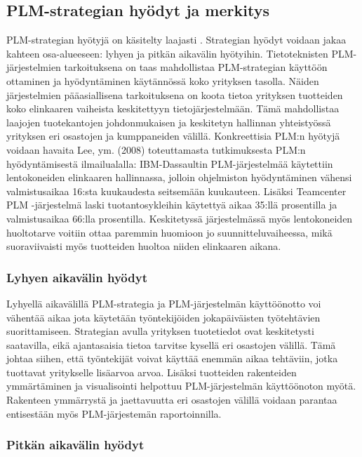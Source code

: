 \subsection{PLM-strategian hyödyt ja merkitys} \label{PLM strategian hyödyt}

PLM-strategian hyötyjä on käsitelty laajasti \cite{alemanni_key_2008} \cite{rivest_product_2012}. Strategian hyödyt voidaan jakaa kahteen osa-alueeseen: lyhyen ja pitkän aikavälin hyötyihin. Tietoteknisten PLM-järjestelmien tarkoituksena on taas mahdollistaa PLM-strategian käyttöön ottaminen ja hyödyntäminen käytännössä koko yrityksen tasolla. Näiden järjestelmien pääasiallisena tarkoituksena on koota tietoa yrityksen tuotteiden koko elinkaaren vaiheista keskitettyyn tietojärjestelmään. Tämä mahdollistaa laajojen tuotekantojen johdonmukaisen ja keskitetyn hallinnan yhteistyössä yrityksen eri osastojen ja kumppaneiden välillä.
Konkreettisia PLM:n hyötyjä voidaan havaita Lee, ym. (2008) toteuttamasta tutkimuksesta PLM:n hyödyntämisestä ilmailualalla: IBM-Dassaultin PLM-järjestelmää käytettiin lentokoneiden elinkaaren hallinnassa, jolloin ohjelmiston hyödyntäminen vähensi valmistusaikaa 16:sta kuukaudesta seitsemään kuukauteen. Lisäksi Teamcenter PLM -järjestelmä laski tuotantosykleihin käytettyä aikaa 35:llä prosentilla ja valmistusaikaa 66:lla prosentilla. Keskitetyssä järjestelmässä myös lentokoneiden huoltotarve voitiin ottaa paremmin huomioon jo suunnitteluvaiheessa, mikä suoraviivaisti myös tuotteiden huoltoa niiden elinkaaren aikana. \cite{lee_product_2008}

\subsubsection{Lyhyen aikavälin hyödyt} \label{Lyhyen aikavälin hyödyt}

Lyhyellä aikavälillä PLM-strategia ja PLM-järjestelmän käyttöönotto voi vähentää aikaa jota käytetään työntekijöiden jokapäiväisten työtehtävien suorittamiseen. Strategian avulla yrityksen tuotetiedot ovat keskitetysti saatavilla, eikä ajantasaisia tietoa tarvitse kysellä eri osastojen välillä. Tämä johtaa siihen, että työntekijät voivat käyttää enemmän aikaa tehtäviin, jotka tuottavat yritykselle lisäarvoa arvoa. Lisäksi tuotteiden rakenteiden ymmärtäminen ja visualisointi helpottuu PLM-järjestelmän käyttöönoton myötä. Rakenteen ymmärrystä ja jaettavuutta eri osastojen välillä voidaan parantaa entisestään myös PLM-järjestemän raportoinnilla. \cite{alemanni_key_2008}

\subsubsection{Pitkän aikavälin hyödyt} \label{Pitkän aikavälin hyödyt}

